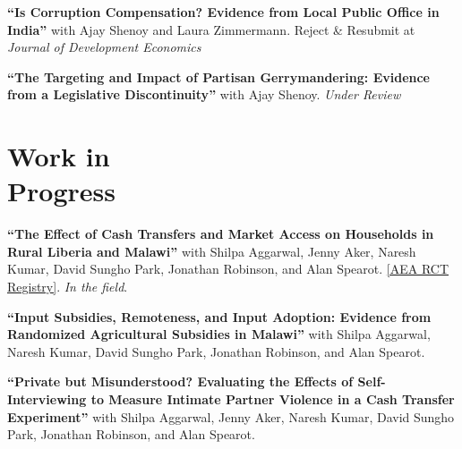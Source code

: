 \documentclass[letterpaper, margin, 10pt]{res} %
\begin{document}
\begin{resume}
\normalsize
{\bf ``{Is Corruption Compensation? Evidence from Local Public Office in India}''} with Ajay Shenoy and Laura Zimmermann. Reject \& Resubmit at \textit{Journal of Development Economics} %



\normalsize
{\bf ``{The Targeting and Impact of Partisan Gerrymandering: Evidence from a Legislative Discontinuity}''} with Ajay Shenoy. \textit{Under Review} %



\normalsize\section{\textbf{Work in  \\ Progress}}
{\bf ``{The Effect of Cash Transfers and Market Access on Households in Rural Liberia and Malawi}''}
 with Shilpa Aggarwal, Jenny Aker, Naresh Kumar, David Sungho Park, Jonathan Robinson, and Alan Spearot. \href{https://www.socialscienceregistry.org/trials/4869}{{[AEA RCT Registry]}}. \textit{In the field}.
 
 {\bf ``{Input Subsidies, Remoteness, and Input Adoption: Evidence from Randomized Agricultural Subsidies in Malawi}''}
 with Shilpa Aggarwal, Naresh Kumar, David Sungho Park, Jonathan Robinson, and Alan Spearot.
 
 {\bf ``Private but Misunderstood? Evaluating the Effects of Self-Interviewing to Measure Intimate Partner Violence in a Cash Transfer Experiment''}
 with Shilpa Aggarwal, Jenny Aker, Naresh Kumar, David Sungho Park, Jonathan Robinson, and Alan Spearot.
 


\end{resume}
\end{document}
